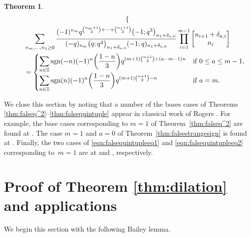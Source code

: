 \documentclass[pdftex]{sigma}
\newtheorem{Theorem}{Theorem}[section]
\numberwithin{equation}{section}
\begin{document}
\begin{Theorem}
\begin{gather}
\begin{cases}
		\end{cases}
\label{eqn:falsequintupleeq2} \\
		\sum_{n_m, \dots, n_1 \geq 0} \frac{(-1)^{n_m}q^{\binom{n_m + 1}{2} + \cdots + \binom{n_1+1}{2}}\bigl(-1;q^3\bigr)_{n_1+\delta_{a,0}}}{(-q)_{n_m}\bigl(q;q^2\bigr)_{n_1 + \delta_{a,0}}(-1;q)_{n_1 + \delta_{a,0}}} \prod_{i=1}^{m-1} \begin{bmatrix} n_{i+1} + \delta_{a,i} \\ n_i \end{bmatrix} \nonumber\\
		\qquad{}=
		\begin{cases}
			\displaystyle \sum_{n \in \mathbb{Z}} {\rm sgn}(-n)(-1)^n\biggl(\frac{1-n}{3}\biggr) q^{(m+1)\binom{n+1}{2} + (a-m-1)n} & \text{if $0 \leq a \leq m-1$}, \\
			\displaystyle \sum_{n \in \mathbb{Z}} {\rm sgn}(n)(-1)^n\biggl(\frac{1-n}{3}\biggr) q^{(m+1)\binom{n+1}{2} - n} & \text{if $a=m$}.
		\end{cases} \nonumber
\end{gather}

\end{Theorem}

We close this section by noting that a number of the bases cases of Theorems \ref{thm:falseq^2}--\ref{thm:falsequintuple} appear in classical work of Rogers \cite{Ro1}. For example, the base cases corresponding to $m=1$ of Theorem~\ref{thm:falseq^2} are found at \cite[p.~334, equation~(7)]{Ro1}. The case $m=1$ and $a=0$ of Theorem~\ref{thm:falsestrangesign} is found at \cite[p.~333, equation~(5)]{Ro1}. Finally, the two cases of \eqref{eqn:falsequintupleeq1} and \eqref{eqn:falsequintupleeq2} corresponding to~${m=1}$ are at \cite[p.~332, equation~(1)]{Ro1} and \cite[p.~332, equation~(2)]{Ro1}, respectively.

\section{Proof of Theorem \ref{thm:dilation} and applications}
\label{sec:dilated}

We begin this section with the following Bailey lemma.
\end{document}

